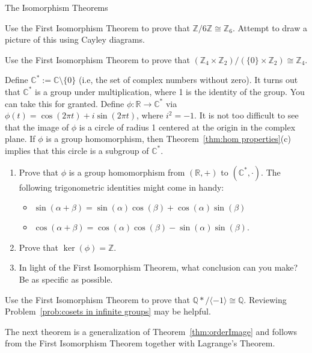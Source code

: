 \begin{section}{The Isomorphism Theorems}
\begin{problem}
Use the First Isomorphism Theorem to prove that $\mathbb{Z}/6\mathbb{Z}\cong \mathbb{Z}_6$.  Attempt to draw a picture of this using Cayley diagrams.
\end{problem}

\begin{problem}
Use the First Isomorphism Theorem to prove that $(\mathbb{Z}_4\times \mathbb{Z}_2)/(\{0\}\times \mathbb{Z}_2)\cong \mathbb{Z}_4$.
\end{problem}

\begin{problem}
Define $\mathbb{C}^*:=\mathbb{C}\setminus \{0\}$ (i.e, the set of complex numbers without zero).  It turns out that $\mathbb{C}^*$ is a group under multiplication, where 1 is the identity of the group. You can take this for granted. Define $\phi:\mathbb{R}\to \mathbb{C}^*$ via $\phi(t)=\cos(2\pi t)+i\sin(2\pi t)$, where $i^2=-1$. It is not too difficult to see that the image of $\phi$ is a circle of radius 1 centered at the origin in the complex plane. If $\phi$ is a group homomorphism, then Theorem~\ref{thm:hom properties}(c) implies that this circle is a subgroup of $\mathbb{C}^*$.
\begin{enumerate}[label=\textrm{(\alph*)}]
\item Prove that $\phi$ is a group homomorphism from $(\mathbb{R},+)$ to $(\mathbb{C}^*,\cdot)$. The following trigonometric identities might come in handy:
\begin{itemize}
\item $\sin(\alpha+\beta)=\sin(\alpha)\cos(\beta)+\cos(\alpha)\sin(\beta)$
\item $\cos(\alpha+\beta)=\cos(\alpha)\cos(\beta)-\sin(\alpha)\sin(\beta)$.
\end{itemize}
\item Prove that $\ker(\phi)=\mathbb{Z}$.
\item In light of the First Isomorphism Theorem, what conclusion can you make? Be as specific as possible.
\end{enumerate}
\end{problem}

\begin{problem}
Use the First Isomorphism Theorem to prove that $\mathbb{Q}*/\langle -1\rangle \cong \mathbb{Q}$. Reviewing Problem~\ref{prob:cosets in infinite groups} may be helpful.
\end{problem}

The next theorem is a generalization of Theorem~\ref{thm:orderImage} and follows from the First Isomorphism Theorem together with Lagrange's Theorem.


\end{section}
